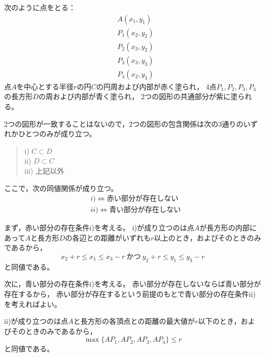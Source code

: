 \documentclass{article}
\begin{document}
次のように点をとる：
\begin{eqnarray*}
    &A(x_1, y_1) \\
    &P_1(x_2, y_2) \\
    &P_2(x_3, y_2) \\
    &P_3(x_3, y_3) \\
    &P_4(x_2, y_3)
\end{eqnarray*}
点$A$を中心とする半径$r$の円$C$の円周および内部が赤く塗られ，
4点$P_1, P_2, P_3, P_4$の長方形$D$の周および内部が青く塗られ，
2つの図形の共通部分が紫に塗られる。

2つの図形が一致することはないので，2つの図形の包含関係は次の3通りのいずれかひとつのみが成り立つ。
\begin{quote}
    i) $C \subset D$ \\
    ii) $D \subset C$ \\
    iii) 上記以外
\end{quote}

ここで，次の同値関係が成り立つ。
\begin{eqnarray*}
    &i) \Longleftrightarrow \mbox{赤い部分が存在しない} \\
    &ii) \Longleftrightarrow \mbox{青い部分が存在しない}
\end{eqnarray*}

まず，赤い部分の存在条件i)を考える。
i)が成り立つのは点$A$が長方形の内部にあって$A$と長方形$D$の各辺との距離がいずれも$r$以上のとき，およびそのときのみであるから，
\[
    x_2 + r \leq x_1 \leq x_3 - r \ \mbox{かつ} \
    y_2 + r \leq y_1 \leq y_3 - r
\]
と同値である。

次に，青い部分の存在条件i)を考える。
赤い部分が存在しないならば青い部分が存在するから，
赤い部分が存在するという前提のもとで青い部分の存在条件ii)を考えればよい。

ii)が成り立つのは点$A$と長方形の各頂点との距離の最大値が$r$以下のとき，およびそのときのみであるから，
\[
    \max \{ AP_1, AP_2, AP_3, AP_4 \} \leq r
\]
と同値である。
\end{document}
